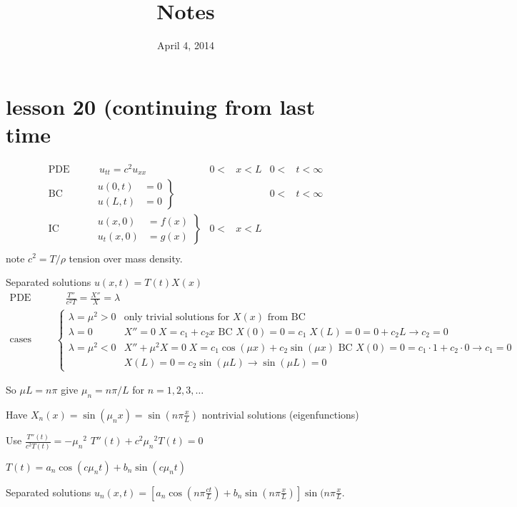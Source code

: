 \documentclass{article}
\begin{document}
\title{Notes}
\date{April 4, 2014}
\maketitle
\section*{lesson 20 (continuing from last time}
\begin{align*}
  \text{PDE}&&&\;\;u_{tt}=c^2u_{xx}&0<&x<L&0<&t<\infty\\
  \text{BC}&&&\left.\begin{aligned}
    u(0,t)&=0\\
    u(L,t)&=0
  \end{aligned}\right\}&&&0<&t<\infty\\
  \text{IC}&&&\left.\begin{aligned}
    u(x,0)&=f(x)\\
    u_t(x,0)&=g(x)
  \end{aligned}\right\}&0<&x<L\\
\end{align*}
note $c^2=T/\rho$ tension over mass density.

Separated solutions $u(x,t)=T(t)X(x)$
\begin{align*}
  \text{PDE}&&&\quad\frac{T''}{c^2T}=\frac{X''}{X}=\lambda\\
  \text{cases}&&&\begin{cases}
    \lambda=\mu^2>0&\text{only trivial solutions for $X(x)$ from BC}\\
    \lambda=0&\text{$X''=0\;X=c_1+c_2x$ BC $X(0)=0=c_1\; X(L)=0=0+c_2L\to c_2=0$}\\
    \lambda=\mu^2<0&\text{$X''+\mu^2X=0\;X=c_1\cos(\mu x)+c_2\sin(\mu x)$ BC $X(0)=0=c_1\cdot1+c_2\cdot0\to c_1=0$}\\
    &X(L)=0=c_2\sin(\mu L)\to \sin(\mu L)=0
  \end{cases}
\end{align*}

So $\mu L=n\pi$ give $\mu_n=n\pi/L$ for $n=1,2,3,\dots$

Have $X_n(x)=\sin(\mu_nx)=\sin(n\pi\frac{x}{L})$ nontrivial solutions (eigenfunctions)

Use $\frac{T''(t)}{c^2T(t)}=-{\mu_n}^2$ $T''(t)+c^2{\mu_n}^2T(t)=0$

$T(t)=a_n\cos(c\mu_nt)+b_n\sin(c\mu_nt)$

Separated solutions $u_n(x,t)=\left[a_n\cos(n\pi\frac{ct}{L})+b_n\sin(n\pi\frac{x}{L})\right]\sin(n\pi\frac{x}{L}$.
\end{document}
